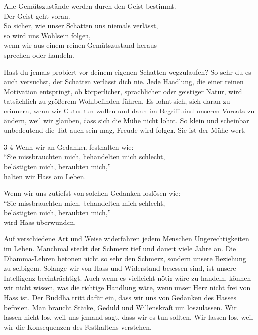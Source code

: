 
\begin{dhpVerse}{2}
\label{dhp-2}
Alle Gemütszustände werden durch den Geist bestimmt.\\ 
Der Geist geht voran.\\ 
So sicher, wie unser Schatten uns niemals verlässt,\\ 
so wird uns Wohlsein folgen,\\ 
wenn wir aus einem reinen Gemütszustand heraus\\ 
sprechen oder handeln. 
\end{dhpVerse}

\begin{dhpRefl}

Hast du jemals probiert vor deinem eigenen Schatten wegzulaufen? So sehr du es
auch versuchst, der Schatten verlässt dich nie. Jede Handlung, die einer
reinen Motivation entspringt, ob körperlicher, sprachlicher oder geistiger
Natur, wird tatsächlich zu größerem Wohlbefinden führen. Es lohnt sich, sich
daran zu erinnern, wenn wir Gutes tun wollen und dann im Begriff sind unseren
Vorsatz zu ändern, weil wir glauben, dass sich die Mühe nicht lohnt. So klein
und scheinbar unbedeutend die Tat auch sein mag, Freude wird folgen. Sie ist
der Mühe wert.

\end{dhpRefl}


\begin{dhpVerse}{3-4}
\label{dhp-3}\label{dhp-4}
Wenn wir an Gedanken festhalten wie:\\ 
“Sie missbrauchten mich, behandelten mich schlecht,\\ 
belästigten mich, beraubten mich,”\\ 
halten wir Hass am Leben. 

Wenn wir uns zutiefst von solchen Gedanken loslösen wie:\\ 
“Sie missbrauchten mich, behandelten mich schlecht,\\ 
belästigten mich, beraubten mich,”\\ 
wird Hass überwunden. 
\end{dhpVerse}

\begin{dhpRefl}

Auf verschiedene Art und Weise widerfahren jedem Menschen Ungerechtigkeiten im
Leben. Manchmal steckt der Schmerz tief und dauert viele Jahre an. Die
Dhamma-Lehren betonen nicht so sehr den Schmerz, sondern unsere Beziehung zu
selbigem. Solange wir von Hass und Widerstand besessen sind, ist unsere
Intelligenz beeinträchtigt. Auch wenn es vielleicht nötig wäre zu handeln,
können wir nicht wissen, was die richtige Handlung wäre, wenn unser Herz nicht
frei von Hass ist. Der Buddha tritt dafür ein, dass wir uns von Gedanken des
Hasses befreien. Man braucht Stärke, Geduld und Willenskraft um loszulassen.
Wir lassen nicht los, weil uns jemand sagt, dass wir es tun sollten. Wir
lassen los, weil wir die Konsequenzen des Festhaltens verstehen.

\end{dhpRefl}

